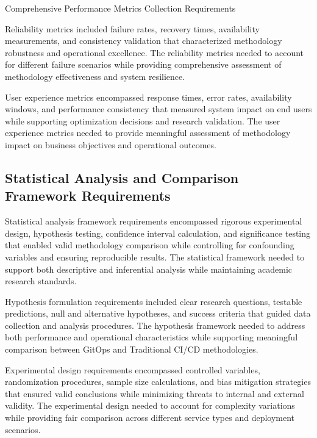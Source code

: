 \begin{table}[H]
\centering
\caption{Comprehensive Performance Metrics Collection Requirements}
\label{tab:performance-metrics-collection}
\end{table}

Reliability metrics included failure rates, recovery times, availability measurements, and consistency validation that characterized methodology robustness and operational excellence. The reliability metrics needed to account for different failure scenarios while providing comprehensive assessment of methodology effectiveness and system resilience.

User experience metrics encompassed response times, error rates, availability windows, and performance consistency that measured system impact on end users while supporting optimization decisions and research validation. The user experience metrics needed to provide meaningful assessment of methodology impact on business objectives and operational outcomes.
\subsection{Statistical Analysis and Comparison Framework Requirements}

Statistical analysis framework requirements encompassed rigorous experimental design, hypothesis testing, confidence interval calculation, and significance testing that enabled valid methodology comparison while controlling for confounding variables and ensuring reproducible results. The statistical framework needed to support both descriptive and inferential analysis while maintaining academic research standards.

Hypothesis formulation requirements included clear research questions, testable predictions, null and alternative hypotheses, and success criteria that guided data collection and analysis procedures. The hypothesis framework needed to address both performance and operational characteristics while supporting meaningful comparison between GitOps and Traditional CI/CD methodologies.

Experimental design requirements encompassed controlled variables, randomization procedures, sample size calculations, and bias mitigation strategies that ensured valid conclusions while minimizing threats to internal and external validity. The experimental design needed to account for complexity variations while providing fair comparison across different service types and deployment scenarios.

